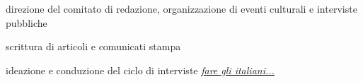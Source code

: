 \documentclass[a4paper]{deedy-resume} %
\begin{document}
\begin{minipage}[t]{0.66\textwidth}
\sectionspace %



\begin{tightitemize}
\item direzione del comitato di redazione, organizzazione di eventi culturali e interviste pubbliche
\item scrittura di articoli e comunicati stampa
\end{tightitemize}

\sectionspace %



\begin{tightitemize}
\item ideazione e conduzione del ciclo di interviste \href{http://www.faretv.net/home/trasmissioni/4-incontri-per-fare-gli-italiani}{\textit{fare gli italiani...}}
\end{tightitemize}

\sectionspace %



\begin{tightitemize}
\item
\end{tightitemize}

\sectionspace %



\begin{tightitemize}
\item
\end{tightitemize}


\end{minipage}
\end{document}
